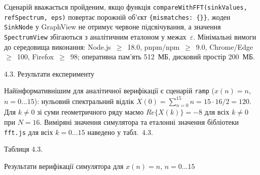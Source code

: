 Сценарій вважається пройденим, якщо функція
\texttt{compareWithFFT(sinkValues, refSpectrum, eps)} повертає порожній
об'єкт \texttt{\{mismatches: \{\}\}}, жоден \texttt{SinkNode} у GraphView
не отримує червоне підсвічування, а значення \texttt{SpectrumView}
збігаються з аналітичним еталоном у межах~\(\varepsilon\). Мінімальні
вимоги до середовища виконання: Node.js~\(\geq\)~18.0, pnpm/npm~\(\geq\)~9.0,
Chrome/Edge~\(\geq\)~100, Firefox~\(\geq\)~98; оперативна пам'ять
512~МБ, дисковий простір 200~МБ.

\protect{}\label{_Toc229681167}{}4.3. Результати
експерименту

Найінформативнішим для аналітичної верифікації є сценарій \texttt{ramp}
(\(x(n)=n\), \(n=0\ldots15\)): нульовий спектральний відлік
\(X(0)=\sum_{n=0}^{15}n=15\cdot16/2=120\). Для \(k\neq0\) зі суми
геометричного ряду маємо \(Re\{X(k)\}=-8\) для всіх \(k\neq0\) при
\(N=16\). Виміряні значення симулятора та еталонні значення бібліотеки
\texttt{fft.js} для всіх \(k=0\ldots15\) наведено у табл.~4.3.

Таблиця 4.3.

Результати верифікації симулятора для \(x(n)=n\), \(n=0\ldots15\)

